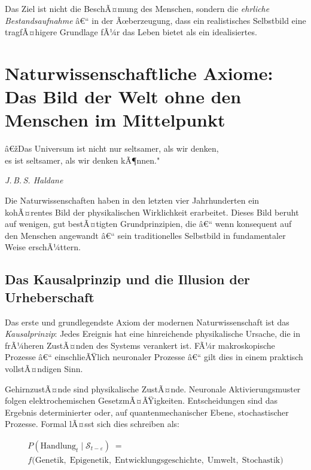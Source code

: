 ﻿\documentclass[12pt, a4paper]{article}
\begin{document}
Das Ziel ist nicht die BeschÃ¤mung des Menschen, sondern die \emph{ehrliche
Bestandsaufnahme} â€“ in der Ãœberzeugung, dass ein realistisches Selbstbild eine
tragfÃ¤higere Grundlage fÃ¼r das Leben bietet als ein idealisiertes.

\section{Naturwissenschaftliche Axiome: Das Bild der Welt ohne den Menschen im Mittelpunkt}

\epigraph{â€žDas Universum ist nicht nur seltsamer, als wir denken,\\
es ist seltsamer, als wir denken kÃ¶nnen."}{\textit{J.\,B.\,S. Haldane}}

Die Naturwissenschaften haben in den letzten vier Jahrhunderten ein kohÃ¤rentes
Bild der physikalischen Wirklichkeit erarbeitet. Dieses Bild beruht auf wenigen,
gut bestÃ¤tigten Grundprinzipien, die â€“ wenn konsequent auf den Menschen angewandt â€“
sein traditionelles Selbstbild in fundamentaler Weise erschÃ¼ttern.

\subsection{Das Kausalprinzip und die Illusion der Urheberschaft}

Das erste und grundlegendste Axiom der modernen Naturwissenschaft ist das
\emph{Kausalprinzip}: Jedes Ereignis hat eine hinreichende physikalische Ursache,
die in frÃ¼heren ZustÃ¤nden des Systems verankert ist. FÃ¼r makroskopische Prozesse â€“
einschlieÃŸlich neuronaler Prozesse â€“ gilt dies in einem praktisch vollstÃ¤ndigen Sinn.

GehirnzustÃ¤nde sind physikalische ZustÃ¤nde. Neuronale Aktivierungsmuster folgen
elektrochemischen GesetzmÃ¤ÃŸigkeiten. Entscheidungen sind das Ergebnis determinierter
oder, auf quantenmechanischer Ebene, stochastischer Prozesse. Formal lÃ¤sst sich dies
schreiben als:

\begin{multline}
  P(\text{Handlung}_t \mid \mathcal{S}_{t-\varepsilon}) \;=\\
  f\!\bigl(\text{Genetik},\;\text{Epigenetik},\;\text{Entwicklungsgeschichte},\;
  \text{Umwelt},\;\text{Stochastik}\bigr)
\end{multline}
\end{document}
